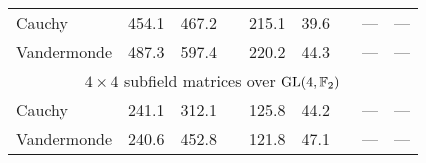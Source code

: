 \begin{table}
\begin{sidecaption}
\begin{threeparttable}
\begin{tabular}{lrrcrrcrr}
        \midrule
        Cauchy            & 454.1 &  467.2   & & 215.1 &   39.6  & & ---  &   ---    \\
        Vandermonde       & 487.3 &  597.4   & & 220.2 &   44.3  & & ---  &   ---    \\
        \bottomrule
        \toprule
        \multicolumn{9}{c}{$4 \times 4$ subfield matrices over $\mathrm{GL}(4, \mathbb{F}_2)$}             \\ \rowcolor{gray!10}
        \midrule
        Cauchy            & 241.1 &  312.1   & & 125.8 &   44.2  & & ---  &   ---    \\
        Vandermonde       & 240.6 &  452.8   & & 121.8 &   47.1  & & ---  &   ---    \\
        \bottomrule
    \end{tabular}
    \end{threeparttable}
    \end{sidecaption}
\end{table}

